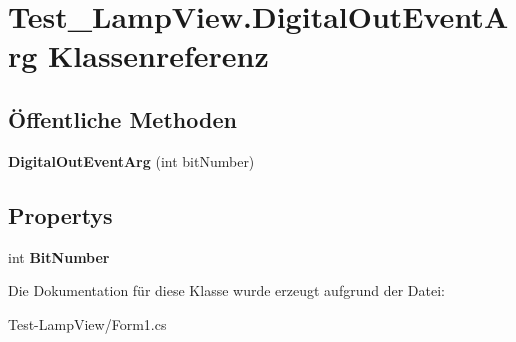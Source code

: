 \hypertarget{class_test___lamp_view_1_1_digital_out_event_arg}{
\section{Test\_\-LampView.DigitalOutEventArg Klassenreferenz}
\label{class_test___lamp_view_1_1_digital_out_event_arg}
}
\subsection*{Öffentliche Methoden}
\begin{DoxyCompactItemize}
\item 
\hypertarget{class_test___lamp_view_1_1_digital_out_event_arg_a1f74109a1a14c365be62d74fb441be4c}{
{\bfseries DigitalOutEventArg} (int bitNumber)}
\label{class_test___lamp_view_1_1_digital_out_event_arg_a1f74109a1a14c365be62d74fb441be4c}

\end{DoxyCompactItemize}
\subsection*{Propertys}
\begin{DoxyCompactItemize}
\item 
\hypertarget{class_test___lamp_view_1_1_digital_out_event_arg_a2e91db32b8a2b3506e6ee4643d5a5a09}{
int {\bfseries BitNumber}}
\label{class_test___lamp_view_1_1_digital_out_event_arg_a2e91db32b8a2b3506e6ee4643d5a5a09}

\end{DoxyCompactItemize}


Die Dokumentation für diese Klasse wurde erzeugt aufgrund der Datei:\begin{DoxyCompactItemize}
\item 
Test-\/LampView/Form1.cs\end{DoxyCompactItemize}
